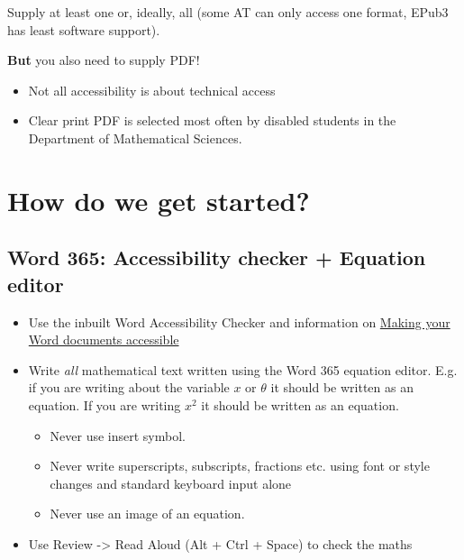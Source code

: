 \documentclass[
  10pt,
  a4paper]{article}
\providecommand{\tightlist}{%
  \setlength{\itemsep}{0pt}\setlength{\parskip}{0pt}}
\begin{document}
Supply at least one or, ideally, all (some AT can only access one format, EPub3 has least software support).

\textbf{But} you also need to supply PDF!

\begin{itemize}
\tightlist
\item
  Not all accessibility is about technical access
\item
  Clear print PDF is selected most often by disabled students in the Department of Mathematical Sciences.
\end{itemize}

\hypertarget{how-do-we-get-started}{%
\section{How do we get started?}\label{how-do-we-get-started}}

\hypertarget{word-365-accessibility-checker-equation-editor}{%
\subsection{Word 365: Accessibility checker + Equation editor}\label{word-365-accessibility-checker-equation-editor}}

\begin{itemize}
\tightlist
\item
  Use the inbuilt Word Accessibility Checker and information on \href{https://support.office.com/en-gb/article/make-your-word-documents-accessible-to-people-with-disabilities-d9bf3683-87ac-47ea-b91a-78dcacb3c66d}{Making your Word documents accessible}
\item
  Write \emph{all} mathematical text written using the Word 365 equation editor. E.g. if you are writing about the variable \(x\) or \(\theta\) it should be written as an equation. If you are writing \(x^2\) it should be written as an equation.

  \begin{itemize}
  \tightlist
  \item
    Never use insert symbol.
  \item
    Never write superscripts, subscripts, fractions etc. using font or style changes and standard keyboard input alone
  \item
    Never use an image of an equation.
  \end{itemize}
\item
  Use Review -\textgreater{} Read Aloud (Alt + Ctrl + Space) to check the maths
\end{itemize}
\end{document}

